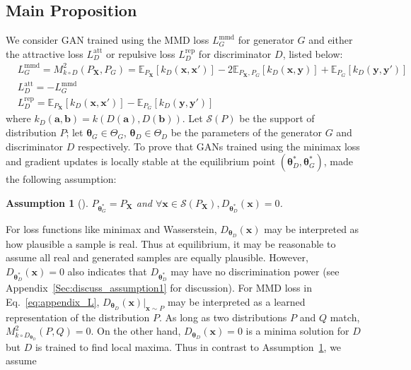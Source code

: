 \documentclass{article} %
\theoremstyle{plain}
\newtheorem{assumption}{Assumption}
\newtheorem*{proposition 1*}{Proposition 1}
\newcommand{\ds}[1]{\mathcal{#1}}  %
\newcommand{\set}[1]{\mathbb{#1}}  %
\newcommand{\rdv}[1]{\mathbf{#1}}  %
\begin{document}
\begin{appendices}
\subsection{Main Proposition}
\label{sec:theory:stability}
We consider GAN trained using the MMD loss \(L_{G}^{\text{mmd}}\) for generator \(G\) and either the attractive loss \(L_{D}^{\text{att}}\) or repulsive loss \(L_{D}^{\text{rep}}\) for discriminator \(D\), listed below: 
\begin{subequations}
	\label{eq:appendix_L}
	\begin{align}
		&L_{G}^{\text{mmd}}=M_{k\circ D}^2(P_{\rdv{X}},P_{G})=\set{E}_{P_{\rdv{X}}}[k_D(\bm{x},\bm{x}')]-2\set{E}_{P_{\rdv{X}},P_{G}}[k_D(\bm{x},\bm{y})]+\set{E}_{P_G}[k_D(\bm{y},\bm{y}')] \label{eq:appendix_L_G}\\
		&L_D^{\text{att}}=-L_{G}^{\text{mmd}} \label{eq:appendix_L_att}\\
		&L_{D}^{\text{rep}}=\set{E}_{P_{\rdv{X}}}[k_D(\bm{x},\bm{x}')]-\set{E}_{P_G}[k_D(\bm{y},\bm{y}')] \label{eq:appendix_L_rep}
	\end{align}
\end{subequations}
where \(k_D(\bm{a},\bm{b})=k(D(\bm{a}), D(\bm{b}))\). Let \(\ds{S}(P)\) be the support of distribution \(P\); let \(\bm{\theta}_{G}\in\Theta_G\), \(\bm{\theta}_{D}\in\Theta_D\) be the parameters of the generator \(G\) and discriminator \(D\) respectively. To prove that GANs trained using the minimax loss and gradient updates is locally stable at the equilibrium point \((\bm{\theta}_D^*,\bm{\theta}_G^*)\), \cite{gan_stable} made the following assumption:
\begin{assumption}[\cite{gan_stable}]\label{Assum:zero}
	\(P_{\bm{\theta}_G^*}=P_{\rdv{X}}\) and \(\forall \bm{x}\in\ds{S}(P_{\rdv{X}}), D_{\bm{\theta}_D^*}(\bm{x})=0\).
\end{assumption}
For loss functions like minimax and Wasserstein, \(D_{\bm{\theta}_D}(\bm{x})\) may be interpreted as how plausible a sample is real. Thus at equilibrium, it may be reasonable to assume all real and generated samples are equally plausible. However, \(D_{\bm{\theta}_D^*}(\bm{x})=0\) also indicates that \(D_{\bm{\theta}_D^*}\) may have no discrimination power (see Appendix~\ref{Sec:discuss_assumption1} for discussion). For MMD loss in Eq.~\ref{eq:appendix_L}, \(D_{\bm{\theta}_D}(\bm{x})|_{\bm{x}\sim P}\) may be interpreted as a learned representation of the distribution \(P\). As long as two distributions \(P\) and \(Q\) match, \(M_{k\circ D_{\bm{\theta}_D}}^2(P,Q)=0\). On the other hand, \(D_{\bm{\theta}_D}(\bm{x})=0\) is a minima solution for \(D\) but \(D\) is trained to find local maxima. Thus in contrast to Assumption~\ref{Assum:zero}, we assume

\end{appendices}
\end{document}
